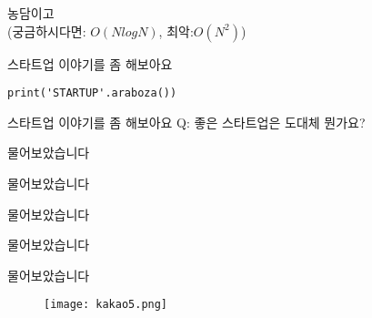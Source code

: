 \documentclass{beamer}
\begin{document}
\begin{frame}
농담이고\\
(궁금하시다면: $O(NlogN)$, 최악:$O(N^2)$)
\end{frame}

\begin{frame}[fragile]{스타트업 이야기를 좀 해보아요}
\begin{lstlisting}
print('STARTUP'.araboza())
\end{lstlisting}
\end{frame}

\begin{frame}[fragile]{스타트업 이야기를 좀 해보아요}
Q: 좋은 스타트업은 도대체 뭔가요?
\end{frame}

\begin{frame}[fragile]{물어보았습니다}
\begin{figure}[H]
  \centering
\end{figure}
\end{frame}

\begin{frame}[fragile]{물어보았습니다}
\begin{figure}[H]
  \centering
\end{figure}
\end{frame}

\begin{frame}[fragile]{물어보았습니다}
\begin{figure}[H]
  \centering
\end{figure}
\end{frame}

\begin{frame}[fragile]{물어보았습니다}
\begin{figure}[H]
  \centering
\end{figure}
\end{frame}

\begin{frame}[fragile]{물어보았습니다}
\begin{figure}[H]
  \centering
    \texttt{[image: kakao5.png]}
\end{figure}
\end{frame}
\end{document}
